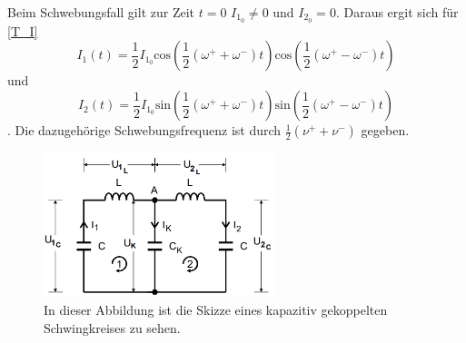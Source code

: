 Beim Schwebungsfall gilt zur Zeit $t = 0$ $I_{1_0}\neq 0$ und $I_{2_0} = 0$. Daraus ergit sich für \autoref{T_I} 
\begin{equation*}
    I_1(t) = \frac{1}{2} I_{1_0}\text{cos}\left(\frac{1}{2}(\omega^+ + \omega^-)t\right) \text{cos}\left(\frac{1}{2}(\omega^+ - \omega^-)t\right)
\end{equation*}
und
\begin{equation*}
    I_2(t) = \frac{1}{2} I_{1_0}\text{sin}\left(\frac{1}{2}(\omega^+ + \omega^-)t\right) \text{sin}\left(\frac{1}{2}(\omega^+ - \omega^-)t\right)
\end{equation*}
.
Die dazugehörige Schwebungsfrequenz ist durch $\frac{1}{2}\left(\nu^+ + \nu^-\right)$ gegeben.
\begin{figure}
    \centering
    \caption{In dieser Abbildung ist die Skizze eines kapazitiv gekoppelten Schwingkreises zu sehen. \cite{v355}}
    \label{fig:T_skgS}
    \includegraphics[width = 0.6\textwidth]{content/SkizzegekoppelterSchwingkreis.PNG}
\end{figure}
